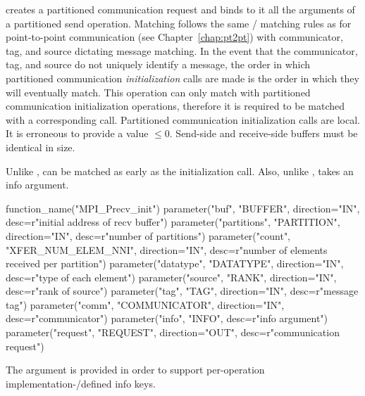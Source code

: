 \noindent {} 
creates a partitioned communication request and binds to it all the
arguments of a partitioned send operation.
Matching follows the same \MPI/ matching rules as for point-to-point communication (see Chapter~\ref{chap:pt2pt}) with communicator, tag, and source dictating
message matching. In the event that the communicator, tag, and source do not
uniquely identify a message, the order in which partitioned 
communication \emph{initialization} calls are made is the order in which they will eventually match.
This operation can only match with partitioned communication initialization operations,
therefore it is required to be matched with a corresponding
 call. 
Partitioned communication initialization calls are
local. It is erroneous to provide a  value $\le 0$.
Send-side and receive-side buffers must be identical in size.

\begin{implementors}
  Unlike ,  can be matched as early as the initialization call.
  Also, unlike ,  takes an info argument.  
\end{implementors}
 
\begin{mpi-binding}
    function_name("MPI_Precv_init")
    parameter("buf", "BUFFER", direction="IN", desc=r"initial address of recv buffer")
    parameter("partitions", "PARTITION", direction="IN", desc=r"number of partitions")
    parameter("count", "XFER_NUM_ELEM_NNI", direction="IN", desc=r"number of elements received per partition")
    parameter("datatype", "DATATYPE", direction="IN", desc=r"type of each element")
    parameter("source", "RANK", direction="IN", desc=r"rank of source")
    parameter("tag", "TAG", direction="IN", desc=r"message tag")
    parameter("comm", "COMMUNICATOR", direction="IN", desc=r"communicator")
    parameter("info", "INFO", desc=r"info argument")
    parameter("request", "REQUEST", direction="OUT", desc=r"communication request")
\end{mpi-binding}

\begin{rationale}
The  argument is provided in order to support per-operation implementation\hyphen/defined info keys.
\end{rationale}

